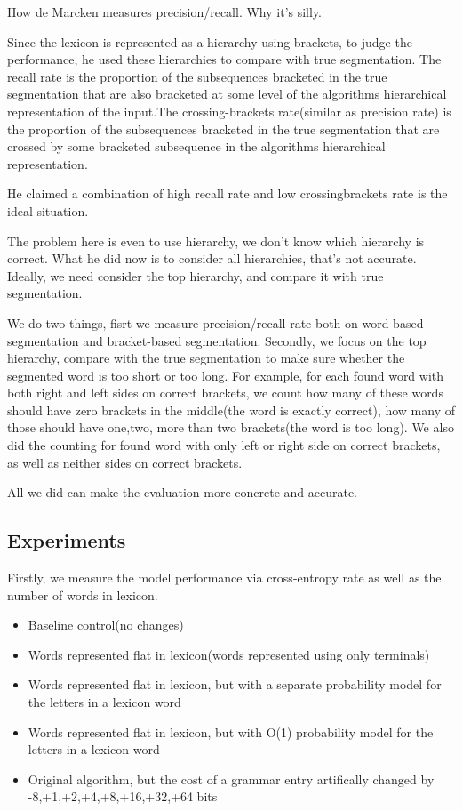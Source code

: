 \documentclass[11pt, oneside, fleqn]{article}
\begin{document}
	How de Marcken measures precision/recall. Why it's silly.
    
    Since the lexicon is represented as a hierarchy using brackets, to judge the performance, he used these hierarchies to compare with true segmentation. The recall rate is the proportion of the subsequences bracketed in the true segmentation that are also bracketed at some level of the algorithms hierarchical representation of the input.The crossing-brackets rate(similar as precision rate) is the proportion of the subsequences bracketed in the true segmentation that are crossed by some bracketed subsequence in the algorithms hierarchical representation. 
    
    He claimed a combination of high recall rate and low crossingbrackets rate is the ideal situation. 

	The problem here is even to use hierarchy, we don't know which hierarchy is correct. What he did now is to consider all hierarchies, that's not accurate. Ideally, we need consider the top hierarchy, and compare it with true segmentation.  

    We do two things, fisrt we measure precision/recall rate both on word-based segmentation and bracket-based segmentation. Secondly, we focus on the top hierarchy, compare with the true segmentation to make sure whether the segmented word is too short or too long. For example, for each found word with both right and left sides on correct brackets, we count how many of these words should have zero brackets in the middle(the word is exactly correct), how many of those should have one,two, more than two brackets(the word is too long). We also did the counting for found word with only left or right side on correct brackets, as well as neither sides on correct brackets.

    All we did can make the evaluation more concrete and accurate. 

  \subsection*{Experiments}
  
  Firstly, we measure the model performance via cross-entropy rate as well as the number of words in lexicon. 
  \begin{itemize}
    \item Baseline control(no changes)
    \item Words represented flat in lexicon(words represented using only terminals)
    \item Words represented flat in lexicon, but with a separate probability model for the letters in a lexicon word
    \item Words represented flat in lexicon, but with O(1) probability model for the letters in a lexicon word
    \item Original algorithm, but the cost of a grammar entry artifically changed by -8,+1,+2,+4,+8,+16,+32,+64 bits
   \end{itemize}
\end{document}
